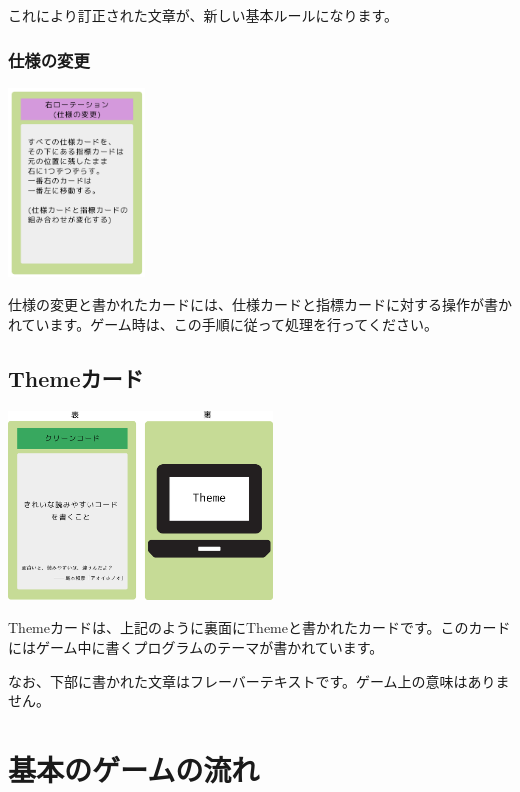 \documentclass[index]{subfiles}
\begin{document}
これにより訂正された文章が、新しい基本ルールになります。

  \subsubsection{仕様の変更}

\begin{center}
  \includegraphics[height=5cm]{image/107_spec_change.png}
\end{center}

{\sf 仕様の変更}と書かれたカードには、仕様カードと指標カードに対する操作が書かれています。ゲーム時は、この手順に従って処理を行ってください。
  
  \subsection{Themeカード}

\begin{center}
  \includegraphics[height=5cm]{image/108_theme_card.png}
\end{center}

Themeカードは、上記のように裏面にThemeと書かれたカードです。このカードにはゲーム中に書くプログラムのテーマが書かれています。

なお、下部に書かれた文章はフレーバーテキストです。ゲーム上の意味はありません。

  \section{基本のゲームの流れ}
  \label{sec:game_flow}
\end{document}
